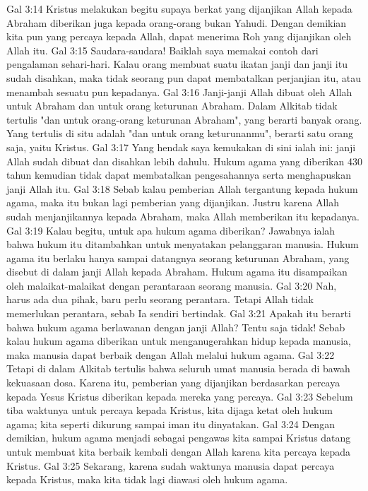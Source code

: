 Gal 3:14  Kristus melakukan begitu supaya berkat yang dijanjikan Allah kepada Abraham diberikan juga kepada orang-orang bukan Yahudi. Dengan demikian kita pun yang percaya kepada Allah, dapat menerima Roh yang dijanjikan oleh Allah itu.
Gal 3:15  Saudara-saudara! Baiklah saya memakai contoh dari pengalaman sehari-hari. Kalau orang membuat suatu ikatan janji dan janji itu sudah disahkan, maka tidak seorang pun dapat membatalkan perjanjian itu, atau menambah sesuatu pun kepadanya.
Gal 3:16  Janji-janji Allah dibuat oleh Allah untuk Abraham dan untuk orang keturunan Abraham. Dalam Alkitab tidak tertulis "dan untuk orang-orang keturunan Abraham", yang berarti banyak orang. Yang tertulis di situ adalah "dan untuk orang keturunanmu", berarti satu orang saja, yaitu Kristus.
Gal 3:17  Yang hendak saya kemukakan di sini ialah ini: janji Allah sudah dibuat dan disahkan lebih dahulu. Hukum agama yang diberikan 430 tahun kemudian tidak dapat membatalkan pengesahannya serta menghapuskan janji Allah itu.
Gal 3:18  Sebab kalau pemberian Allah tergantung kepada hukum agama, maka itu bukan lagi pemberian yang dijanjikan. Justru karena Allah sudah menjanjikannya kepada Abraham, maka Allah memberikan itu kepadanya.
Gal 3:19  Kalau begitu, untuk apa hukum agama diberikan? Jawabnya ialah bahwa hukum itu ditambahkan untuk menyatakan pelanggaran manusia. Hukum agama itu berlaku hanya sampai datangnya seorang keturunan Abraham, yang disebut di dalam janji Allah kepada Abraham. Hukum agama itu disampaikan oleh malaikat-malaikat dengan perantaraan seorang manusia.
Gal 3:20  Nah, harus ada dua pihak, baru perlu seorang perantara. Tetapi Allah tidak memerlukan perantara, sebab Ia sendiri bertindak.
Gal 3:21  Apakah itu berarti bahwa hukum agama berlawanan dengan janji Allah? Tentu saja tidak! Sebab kalau hukum agama diberikan untuk menganugerahkan hidup kepada manusia, maka manusia dapat berbaik dengan Allah melalui hukum agama.
Gal 3:22  Tetapi di dalam Alkitab tertulis bahwa seluruh umat manusia berada di bawah kekuasaan dosa. Karena itu, pemberian yang dijanjikan berdasarkan percaya kepada Yesus Kristus diberikan kepada mereka yang percaya.
Gal 3:23  Sebelum tiba waktunya untuk percaya kepada Kristus, kita dijaga ketat oleh hukum agama; kita seperti dikurung sampai iman itu dinyatakan.
Gal 3:24  Dengan demikian, hukum agama menjadi sebagai pengawas kita sampai Kristus datang untuk membuat kita berbaik kembali dengan Allah karena kita percaya kepada Kristus.
Gal 3:25  Sekarang, karena sudah waktunya manusia dapat percaya kepada Kristus, maka kita tidak lagi diawasi oleh hukum agama.
